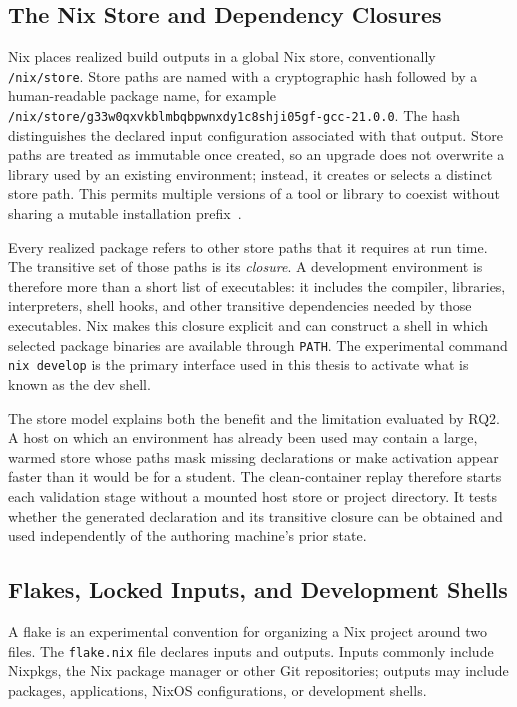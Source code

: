 \subsection{The Nix Store and Dependency Closures}

Nix places realized build outputs in a global Nix store, conventionally \texttt{/nix/store}.
Store paths are named with a cryptographic hash followed by a human-readable
package name, for example \texttt{/nix/store/g33w0qxvkblmbqbpwnxdy1c8shji05gf-gcc-21.0.0}.
The hash distinguishes the declared input configuration associated with that output.
Store paths are treated as immutable once created, so an upgrade does not overwrite
a library used by an existing environment; instead, it creates or selects a distinct
store path. This permits multiple versions of a tool or library to coexist
without sharing a mutable installation prefix~\cite{dolstraNixOSPurelyFunctional2010}.

Every realized package refers to other store paths that it requires at run time. The
transitive set of those paths is its \emph{closure}. A development environment is
therefore more than a short list of executables: it includes the compiler, libraries,
interpreters, shell hooks, and other transitive dependencies needed by those
executables. Nix makes this closure explicit and can construct a shell in which selected
package binaries are available through \texttt{PATH}. The experimental command \texttt{nix
develop} is the primary interface used in this thesis to activate what is known
as the dev shell.

The store model explains both the benefit and the limitation evaluated by RQ2. A host
on which an environment has already been used may contain a large, warmed store
whose paths mask missing declarations or make activation appear faster than it
would be for a student. The clean-container replay therefore starts each validation
stage without a mounted host store or project directory. It tests whether the
generated declaration and its transitive closure can be obtained and used
independently of the authoring machine's prior state.

\subsection{Flakes, Locked Inputs, and Development Shells}

A flake is an experimental convention for organizing a Nix project around two files.
The \texttt{flake.nix} file declares inputs and outputs. Inputs commonly include
Nixpkgs, the Nix package manager or other Git repositories; outputs may include
packages, applications, NixOS configurations, or development shells.

